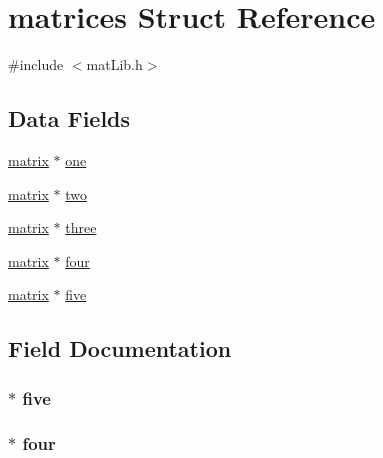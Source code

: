\hypertarget{structmatrices}{}\section{matrices Struct Reference}
\label{structmatrices}


{\ttfamily \#include $<$mat\+Lib.\+h$>$}

\subsection*{Data Fields}
\begin{DoxyCompactItemize}
\item 
\hyperlink{structmatrix}{matrix} $\ast$ \hyperlink{structmatrices_ad97a9cc9eeba5aca384adb75d6f55523}{one}
\item 
\hyperlink{structmatrix}{matrix} $\ast$ \hyperlink{structmatrices_a31cb6e4fadb7864f73c08b64b117458b}{two}
\item 
\hyperlink{structmatrix}{matrix} $\ast$ \hyperlink{structmatrices_aae2403a9b85add9395f1e8849c7ead97}{three}
\item 
\hyperlink{structmatrix}{matrix} $\ast$ \hyperlink{structmatrices_ad256291c2395376c1195dfb8afda9dde}{four}
\item 
\hyperlink{structmatrix}{matrix} $\ast$ \hyperlink{structmatrices_a90c7c499a6d50610d45e1f716313b799}{five}
\end{DoxyCompactItemize}


\subsection{Field Documentation}
\hypertarget{structmatrices_a90c7c499a6d50610d45e1f716313b799}{}
\subsubsection[{five}]{$\ast$ five}\label{structmatrices_a90c7c499a6d50610d45e1f716313b799}
\hypertarget{structmatrices_ad256291c2395376c1195dfb8afda9dde}{}
\subsubsection[{four}]{$\ast$ four}\label{structmatrices_ad256291c2395376c1195dfb8afda9dde}
\hypertarget{structmatrices_ad97a9cc9eeba5aca384adb75d6f55523}{}

